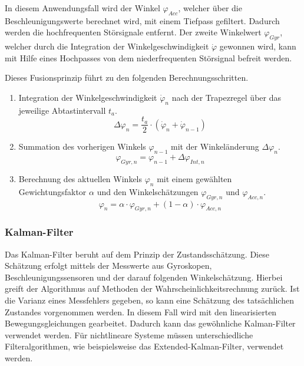 In diesem Anwendungsfall wird der Winkel $\varphi_{Acc}$, welcher über die Beschleunigungswerte berechnet wird, mit einem Tiefpass gefiltert. Dadurch werden die hochfrequenten Störsignale entfernt. Der zweite Winkelwert $\varphi_{Gyr}$, welcher durch die Integration der Winkelgeschwindigkeit $\dot{\varphi}$ gewonnen wird, kann mit Hilfe eines Hochpasses von dem niederfrequenten Störsignal befreit werden.

Dieses Fusionsprinzip führt zu den folgenden Berechnungsschritten.

\begin{enumerate}
 \item Integration der Winkelgeschwindigkeit $\dot{\varphi}_n$ nach der Trapezregel über das jeweilige Abtastintervall $t_a$.
 \begin{equation}
 \Delta \varphi_n = \frac{t_a}{2} \cdot (\dot{\varphi}_n + \dot{\varphi}_{n-1})
 \end{equation}
 \item Summation des vorherigen Winkels $\varphi_{n-1}$ mit der Winkeländerung $\Delta \varphi_{n}$.
 \begin{equation}
 \varphi_{Gyr,n} = \varphi_{n-1} + \Delta \varphi_{Int,n}
 \end{equation}
 \item Berechnung des aktuellen Winkels $\varphi_n$ mit einem gewählten Gewichtungsfaktor $\alpha$ und den Winkelschätzungen $\varphi_{Gyr,n}$ und $\varphi_{Acc,n}$.
 \begin{equation}
 \varphi_n = \alpha \cdot \varphi_{Gyr,n} + (1-\alpha) \cdot \varphi_{Acc,n}
 \end{equation}
\end{enumerate}

\subsubsection{Kalman-Filter}
Das Kalman-Filter beruht auf dem Prinzip der Zustandsschätzung. Diese Schätzung erfolgt mittels der Messwerte aus Gyroskopen, Beschleunigungssensoren und der darauf folgenden Winkelschätzung. Hierbei greift der Algorithmus auf Methoden der Wahrscheinlichkeitsrechnung zurück. Ist die Varianz eines Messfehlers gegeben, so kann eine Schätzung des tatsächlichen Zustandes vorgenommen werden.
In diesem Fall wird mit den linearisierten Bewegungsgleichungen gearbeitet. Dadurch kann das gewöhnliche Kalman-Filter verwendet werden. Für nichtlineare Systeme müssen unterschiedliche Filteralgorithmen, wie beispielsweise das Extended-Kalman-Filter, verwendet werden.


